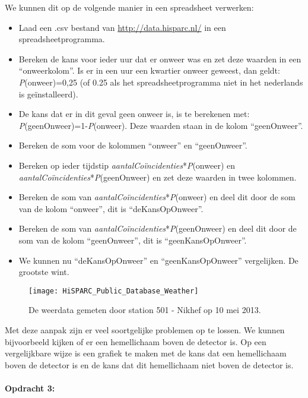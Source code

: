 We kunnen dit op de volgende manier in een spreadsheet verwerken:
\begin{itemize}
\item Laad een .csv bestand van \url{http://data.hisparc.nl/} in een spreadsheetprogramma.
\item Bereken de kans voor ieder uur dat er onweer was en zet deze waarden
in een ``onweerkolom''. Is er in een uur een kwartier onweer geweest,
dan geldt: \emph{P}(onweer)=0,25 (of 0.25 als het spreadsheetprogramma
niet in het nederlands is geïnstalleerd). 
\item De kans dat er in dit geval geen onweer is, is te berekenen met: \emph{P}(geenOnweer)=1-\emph{P}(onweer).
Deze waarden staan in de kolom ``geenOnweer''.
\item Bereken de som voor de kolommen ``onweer'' en ``geenOnweer''.
\item Bereken op ieder tijdstip \emph{aantalCoïncidenties}{*}\emph{P}(onweer)
en \emph{aantalCoïncidenties}{*}\emph{P}(geenOnweer) en zet deze waarden
in twee kolommen.
\item Bereken de som van \emph{aantalCoïncidenties}{*}\emph{P}(onweer) en
deel dit door de som van de kolom ``onweer'', dit is ``deKansOpOnweer''. 
\item Bereken de som van \emph{aantalCoïncidenties}{*}\emph{P}(geenOnweer)
en deel dit door de som van de kolom ``geenOnweer'', dit is ``geenKansOpOnweer''. 
\item We kunnen nu ``deKansOpOnweer'' en ``geenKansOpOnweer'' vergelijken.
De grootste wint.
\end{itemize}
\begin{figure}[h]
\noindent \begin{centering}
\texttt{[image: HiSPARC\_Public\_Database\_Weather]}
\par\end{centering}

\caption{De weerdata gemeten door station 501 - Nikhef op 10 mei 2013.}
\end{figure}


Met deze aanpak zijn er veel soortgelijke problemen op te lossen.
We kunnen bijvoorbeeld kijken of er een hemellichaam boven de detector
is. Op een vergelijkbare wijze is een grafiek te maken met de kans
dat een hemellichaam boven de detector is en de kans dat dit hemellichaam
niet boven de detector is.


\paragraph*{Opdracht 3:}

